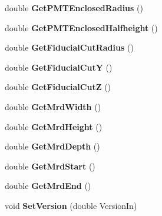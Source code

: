 \begin{DoxyCompactItemize}
\item 
\hypertarget{classGeometry_abd765c4d73ceba92e39d007b6c3362bd}{double {\bfseries Get\-P\-M\-T\-Enclosed\-Radius} ()}\label{classGeometry_abd765c4d73ceba92e39d007b6c3362bd}

\item 
\hypertarget{classGeometry_a42b716a80c24a5278099e7ae8515dd69}{double {\bfseries Get\-P\-M\-T\-Enclosed\-Halfheight} ()}\label{classGeometry_a42b716a80c24a5278099e7ae8515dd69}

\item 
\hypertarget{classGeometry_ad33910b8b84b8956ecbfa4954a7ccfcc}{double {\bfseries Get\-Fiducial\-Cut\-Radius} ()}\label{classGeometry_ad33910b8b84b8956ecbfa4954a7ccfcc}

\item 
\hypertarget{classGeometry_a849d59159bc9afef2fb5a5de1b8f920d}{double {\bfseries Get\-Fiducial\-Cut\-Y} ()}\label{classGeometry_a849d59159bc9afef2fb5a5de1b8f920d}

\item 
\hypertarget{classGeometry_a858a7eafaa3c0629e596d1abf3e9346b}{double {\bfseries Get\-Fiducial\-Cut\-Z} ()}\label{classGeometry_a858a7eafaa3c0629e596d1abf3e9346b}

\item 
\hypertarget{classGeometry_a7dc78bc77bd7e01df60c513e3c1f3a8d}{double {\bfseries Get\-Mrd\-Width} ()}\label{classGeometry_a7dc78bc77bd7e01df60c513e3c1f3a8d}

\item 
\hypertarget{classGeometry_ad89709f6efbf3119c90da8e7631e1024}{double {\bfseries Get\-Mrd\-Height} ()}\label{classGeometry_ad89709f6efbf3119c90da8e7631e1024}

\item 
\hypertarget{classGeometry_a867b5607dbd4d3baeed4f03317026af5}{double {\bfseries Get\-Mrd\-Depth} ()}\label{classGeometry_a867b5607dbd4d3baeed4f03317026af5}

\item 
\hypertarget{classGeometry_a43cefba896c4f17a1607b658ae81c47d}{double {\bfseries Get\-Mrd\-Start} ()}\label{classGeometry_a43cefba896c4f17a1607b658ae81c47d}

\item 
\hypertarget{classGeometry_a61a5beb5c95207de729dddb94670ad55}{double {\bfseries Get\-Mrd\-End} ()}\label{classGeometry_a61a5beb5c95207de729dddb94670ad55}

\item 
\hypertarget{classGeometry_afdc0b24374cc8906be35ea93d1c99520}{void {\bfseries Set\-Version} (double Version\-In)}\label{classGeometry_afdc0b24374cc8906be35ea93d1c99520}


\end{DoxyCompactItemize}
